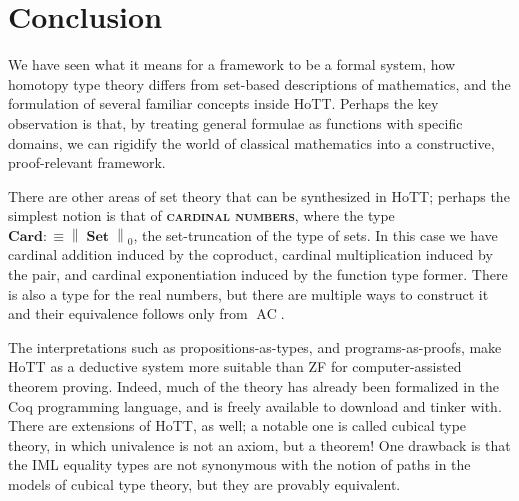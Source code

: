 \documentclass{article}
\newcommand{\defn}[1]{{\scshape\bfseries\color{MPBemph}#1}}
\newcommand{\eql}{\mathbin{:\equiv}}
\newcommand{\1}{\textbf{1}}
\newcommand{\0}{\mathbf{0}}
\newcommand{\2}{\textbf{2}}
\newcommand{\norm}[1][\cdot]{\left\|#1\right\|}
\DeclareMathOperator{\Set}{\textbf{Set}}
\DeclareMathOperator{\AC}{AC}
\begin{document}
\section{Conclusion}
We have seen what it means for a framework to be a formal system, how homotopy type theory differs from set-based descriptions of mathematics, and the formulation of several familiar concepts inside HoTT. Perhaps the key observation is that, by treating general formulae as functions with specific domains, we can rigidify the world of classical mathematics into a constructive, proof-relevant framework.

There are other areas of set theory that can be synthesized in HoTT; perhaps the simplest notion is that of \defn{cardinal numbers}, where the type \( \textbf{Card} \eql \norm[\Set]_{0} \), the set-truncation of the type of sets. In this case we have cardinal addition induced by the coproduct, cardinal multiplication induced by the pair, and cardinal exponentiation induced by the function type former. There is also a type for the real numbers, but there are multiple ways to construct it and their equivalence follows only from \( \AC \).

The interpretations such as propositions-as-types, and programs-as-proofs, make HoTT as a deductive system more suitable than ZF for computer-assisted theorem proving. Indeed, much of the theory has already been formalized in the Coq programming language, and is freely available to download and tinker with. There are extensions of HoTT, as well; a notable one is called cubical type theory, in which univalence is not an axiom, but a theorem! One drawback is that the IML equality types are not synonymous with the notion of paths in the models of cubical type theory, but they are provably equivalent. \newpage


\nocite{*}
\end{document}

